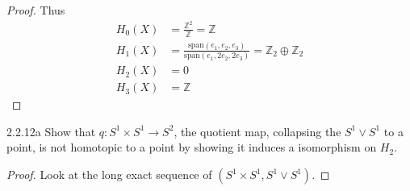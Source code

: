 \documentclass{article}
\newcommand{\Z}{\mathbb{Z}}
\newcommand{\spn}[0]{\text{span}}
\begin{document}
\begin{proof}
    Thus \begin{align*}
        H_0(X) &= \frac{\Z^2}{\Z} = \Z \\
        H_1(X) &= \frac{\spn\left(e_1, e_2, e_3\right)}{\spn\left(e_1, 2e_2, 2e_3\right)} = \Z_2 \oplus \Z_2 \\ 
        H_2(X) &= 0 \\
        H_3(X) &= \Z 
    \end{align*}
\end{proof}

\bigskip

\begin{PROB}{2.2.12a}\label{Problem 2.2.12a.}
    Show that $q: S^1 \times S^1 \to S^2$, the quotient map, collapsing the $S^1 \vee S^1$ to a point, is not homotopic to a point by showing it induces a isomorphism on $H_2$.   
\end{PROB}
\begin{proof}
    Look at the long exact sequence of $(S^1 \times S^1, S^1 \vee S^1)$. 
    
    
\end{proof}

\bigskip
\end{document}
